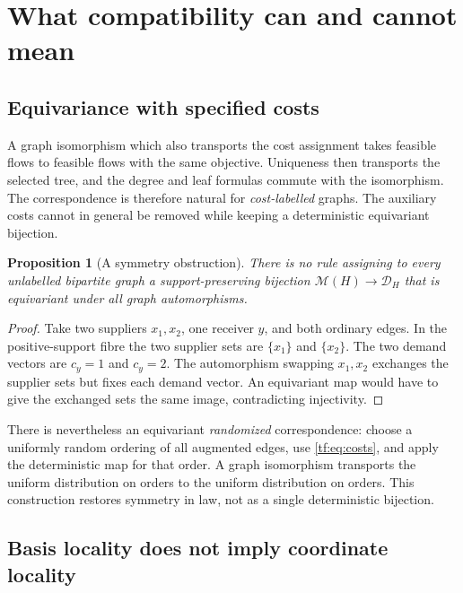 \documentclass[11pt]{article}
\numberwithin{equation}{section}
\newtheorem{proposition}[theorem]{Proposition}
\theoremstyle{definition}
\newcommand{\PM}{\mathcal M}
\newcommand{\cD}{\mathcal D}
\begin{document}
\section{What compatibility can and cannot mean}
\label{tf:sec:limits}

\subsection{Equivariance with specified costs}
A graph isomorphism which also transports the cost assignment takes
feasible flows to feasible flows with the same objective. Uniqueness then
transports the selected tree, and the degree and leaf formulas commute
with the isomorphism. The correspondence is therefore natural for
\emph{cost-labelled} graphs. The auxiliary costs cannot in general be
removed while keeping a deterministic equivariant bijection.

\begin{proposition}[A symmetry obstruction]
\label{tf:prop:symmetry}
There is no rule assigning to every unlabelled bipartite graph a
support-preserving bijection $\PM(H)\to\cD_H$ that is equivariant under
all graph automorphisms.
\end{proposition}
\begin{proof}
Take two suppliers $x_1,x_2$, one receiver $y$, and both ordinary edges.
In the positive-support fibre the two supplier sets are $\{x_1\}$ and
$\{x_2\}$. The two demand vectors are $c_y=1$ and $c_y=2$.
The automorphism swapping $x_1,x_2$ exchanges the supplier sets but fixes
each demand vector. An equivariant map would have to give the exchanged
sets the same image, contradicting injectivity.
\end{proof}

There is nevertheless an equivariant \emph{randomized} correspondence:
choose a uniformly random ordering of all augmented edges, use
\eqref{tf:eq:costs}, and apply the deterministic map for that order. A graph
isomorphism transports the uniform distribution on orders to the uniform
distribution on orders. This construction restores symmetry in law, not
as a single deterministic bijection.

\subsection{Basis locality does not imply coordinate locality}
\end{document}
